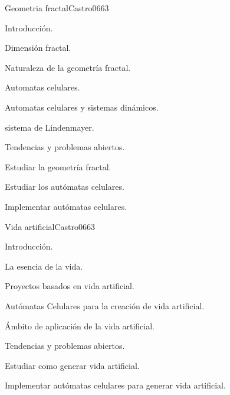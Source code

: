 \begin{syllabus}
\begin{unit}{Geometria fractal}{Castro06}{6}{3}
\begin{topics}
        \item Introducción.
        \item Dimensión fractal.
        \item Naturaleza de la geometría fractal.
        \item Automatas celulares.
        \item Automatas celulares y sistemas dinámicos.
        \item sistema de Lindenmayer.
        \item Tendencias y problemas abiertos.
    \end{topics}
    \begin{unitgoals}
        \item Estudiar la geometría fractal.
        \item Estudiar los autómatas celulares.
        \item Implementar autómatas celulares.
    \end{unitgoals}
\end{unit}

\begin{unit}{Vida artificial}{Castro06}{6}{3}
\begin{topics}
        \item Introducción.
        \item La esencia de la vida.
        \item Proyectos basados en vida artificial.
        \item Autómatas Celulares para la creación de vida artificial.
        \item Ámbito de aplicación de la vida artificial.
        \item Tendencias y problemas abiertos.
    \end{topics}
    \begin{unitgoals}
        \item Estudiar como generar vida artificial.
        \item Implementar autómatas celulares para generar vida artificial.
    \end{unitgoals}
\end{unit}


\end{syllabus}
